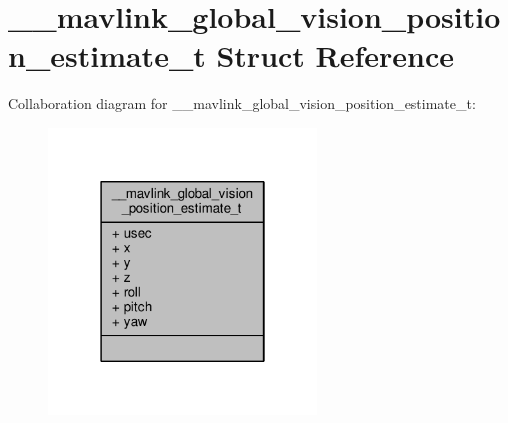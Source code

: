 \hypertarget{struct____mavlink__global__vision__position__estimate__t}{\section{\+\_\+\+\_\+mavlink\+\_\+global\+\_\+vision\+\_\+position\+\_\+estimate\+\_\+t Struct Reference}
\label{struct____mavlink__global__vision__position__estimate__t}
}


Collaboration diagram for \+\_\+\+\_\+mavlink\+\_\+global\+\_\+vision\+\_\+position\+\_\+estimate\+\_\+t\+:
\nopagebreak
\begin{figure}[H]
\begin{center}
\leavevmode
\includegraphics[width=202pt]{struct____mavlink__global__vision__position__estimate__t__coll__graph}
\end{center}
\end{figure}
